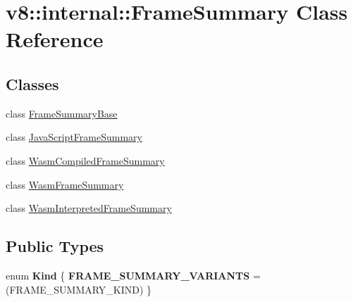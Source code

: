 \hypertarget{classv8_1_1internal_1_1FrameSummary}{}\section{v8\+:\+:internal\+:\+:Frame\+Summary Class Reference}
\label{classv8_1_1internal_1_1FrameSummary}
\subsection*{Classes}
\begin{DoxyCompactItemize}
\item 
class \mbox{\hyperlink{classv8_1_1internal_1_1FrameSummary_1_1FrameSummaryBase}{Frame\+Summary\+Base}}
\item 
class \mbox{\hyperlink{classv8_1_1internal_1_1FrameSummary_1_1JavaScriptFrameSummary}{Java\+Script\+Frame\+Summary}}
\item 
class \mbox{\hyperlink{classv8_1_1internal_1_1FrameSummary_1_1WasmCompiledFrameSummary}{Wasm\+Compiled\+Frame\+Summary}}
\item 
class \mbox{\hyperlink{classv8_1_1internal_1_1FrameSummary_1_1WasmFrameSummary}{Wasm\+Frame\+Summary}}
\item 
class \mbox{\hyperlink{classv8_1_1internal_1_1FrameSummary_1_1WasmInterpretedFrameSummary}{Wasm\+Interpreted\+Frame\+Summary}}
\end{DoxyCompactItemize}
\subsection*{Public Types}
\begin{DoxyCompactItemize}
\item 
\mbox{\label{classv8_1_1internal_1_1FrameSummary_a354dee820f94c70a2b2534b02ae72559}} 
enum {\bfseries Kind} \{ {\bfseries F\+R\+A\+M\+E\+\_\+\+S\+U\+M\+M\+A\+R\+Y\+\_\+\+V\+A\+R\+I\+A\+N\+TS} =(F\+R\+A\+M\+E\+\_\+\+S\+U\+M\+M\+A\+R\+Y\+\_\+\+K\+I\+ND)
 \}
\end{DoxyCompactItemize}
